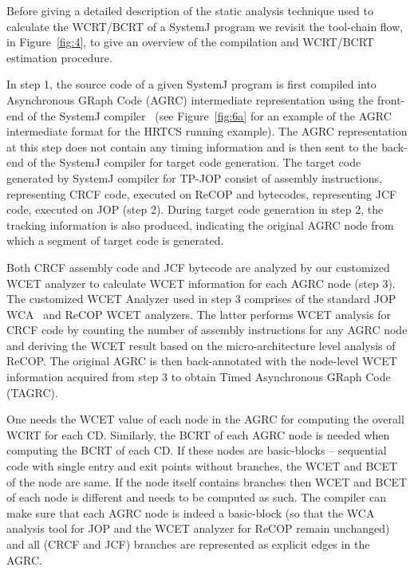 Before giving a detailed description of the static analysis technique
used to calculate the WCRT/BCRT of a SystemJ program we revisit the
tool-chain flow, in Figure~\ref{fig:4}, to give an overview of the
compilation and WCRT/BCRT estimation procedure.

In step 1, the source code of a given SystemJ program is first compiled
into Asynchronous GRaph Code (AGRC) intermediate representation using
the front-end of the SystemJ compiler~\cite{amal10} (see
Figure~\ref{fig:6a} for an example of the AGRC intermediate format for
the HRTCS running example). The AGRC representation at this step does
not contain any timing information and is then sent to the back-end of
the SystemJ compiler for target code generation. The target code
generated by SystemJ compiler for TP-JOP consist of assembly
instructions, representing CRCF code, executed on ReCOP and bytecodes,
representing JCF code, executed on JOP (step 2). During target code
generation in step 2, the tracking information is also produced,
indicating the original AGRC node from which a segment of target code is
generated.

Both CRCF assembly code and JCF bytecode are analyzed by our customized
WCET analyzer to calculate WCET information for each AGRC node (step
3). The customized WCET Analyzer used in step 3 comprises of the
standard JOP WCA~\cite{jop:jnl:jsa2007} and ReCOP WCET analyzers. The
latter performs WCET analysis for CRCF code by counting the number of
assembly instructions for any AGRC node and deriving the WCET result
based on the micro-architecture level analysis of ReCOP. The original
AGRC is then back-annotated with the node-level WCET information
acquired from step 3 to obtain Timed Asynchronous GRaph Code (TAGRC). 


One needs the WCET value of each node in the AGRC for computing the
overall WCRT for each CD. Similarly, the BCRT of each AGRC node is
needed when computing the BCRT of each CD. If these nodes are
basic-blocks -- sequential code with single entry and exit points
without branches, the WCET and BCET of the node are same. If the node
itself contains branches then WCET and BCET of each node is different
and needs to be computed as such. The compiler can make sure that each
AGRC node is indeed a basic-block (so that the WCA analysis tool for JOP
and the WCET analyzer for ReCOP remain unchanged) and all (CRCF and JCF)
branches are represented as explicit edges in the AGRC.

